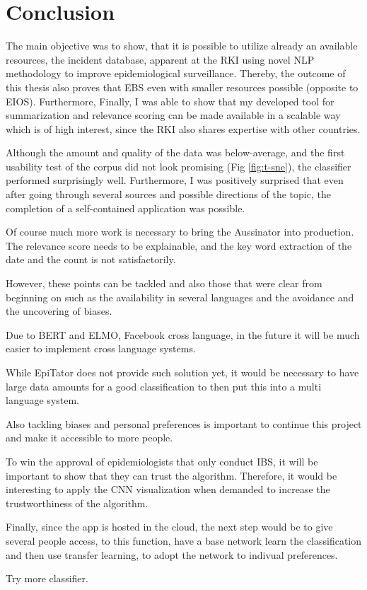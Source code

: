 \chapter{Conclusion}
The main objective was to show, that it is possible to utilize already an available resources, the incident database, apparent at the RKI using novel NLP methodology to improve epidemiological surveillance. Thereby, the outcome of this thesis also proves that EBS even with smaller resources possible (opposite to EIOS). Furthermore, Finally, I was able to show that my developed tool for summarization and relevance scoring can be made available in a scalable way which is of high interest, since the RKI also shares expertise with other countries.

Although the amount and quality of the data was below-average, and the first usability test of the corpus did not look promising (Fig \ref{fig:t-sne}), the classifier performed surprisingly well. Furthermore, I was positively surprised that even after going through several sources and possible directions of the topic, the completion of a self-contained application was possible.

Of course much more work is necessary to bring the Aussinator into production. The relevance score needs to be explainable, and the key word extraction of the date and the count is not satisfactorily.

However, these points can be tackled and also those that were clear from beginning on such as the availability in several languages and the avoidance and the uncovering of biases.


Due to BERT and ELMO, Facebook cross language, in the future it will be much easier to implement cross language systems.

While EpiTator does not provide such solution yet, it would be necessary to have large data amounts for a good classification to then put this into a multi language system.

Also tackling biases and personal preferences is important to continue this project and make it accessible to more people.

To win the approval of epidemiologists that only conduct IBS, it will be important to show that they can trust the algorithm. Therefore, it would be interesting to apply the CNN visualization when demanded to increase the trustworthiness of the algorithm.

Finally, since the app is hosted in the cloud, the next step would be to give several people access, to this function, have a base network learn the classification and then use transfer learning, to adopt the network to indivual preferences.

Try more classifier.
